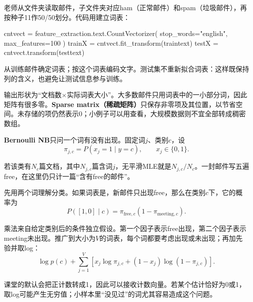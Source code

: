 老师从文件夹读取邮件，子文件夹对应ham（正常邮件）和spam（垃圾邮件），再按种子11作50/50划分。代码用建立词表：



\begin{StudyCode}
cntvect = feature_extraction.text.CountVectorizer(
    stop_words="english", max_features=100
)
trainX = cntvect.fit_transform(traintext)
testX = cntvect.transform(testtext)
\end{StudyCode}


从训练邮件确定词表；按这个词表编码文字。测试集不重新拟合词表：这样既保持列的含义，也避免让测试信息参与训练。


输出形状为“文档数\ensuremath{\times}实际词表大小”。大多数邮件只用词表中的一小部分词，因此矩阵有很多零。\textbf{Sparse matrix（稀疏矩阵）}只保存非零项及其位置，以节省空间。未存储的项仍然表示0；小例子可以用查看，大规模数据则不宜全部转成稠密数组。








\textbf{Bernoulli NB}只问一个词有没有出现。固定词\(j\)、类别\(c\)，设
\[
\pi_{j,c}=P(x_j=1\mid y=c),\qquad x_j\in\{0,1\}.
\tag{2.23}
\]


若该类有\(N_c\)篇文档，其中\(N_{j,c}\)篇含词\(j\)，无平滑MLE就是\(N_{j,c}/N_c\)。一封邮件写五遍free，在这里仍只计一篇“含有free的邮件”。


先用两个词理解分类。如果词表是，新邮件只出现free，那么在类别\(c\)下，它的概率为
\[
P([1,0]\mid c)=\pi_{\mathrm{free},c}(1-\pi_{\mathrm{meeting},c}).
\tag{2.24}
\]


乘法来自给定类别后的条件独立假设。第一个因子表示free出现，第二个因子表示meeting未出现。推广到大小为\(V\)的词表，每个词都要考虑出现或未出现；再加先验并取log：
\[
\log p(c)+\sum_{j=1}^{V}
\left[x_j\log\pi_{j,c}+(1-x_j)\log(1-\pi_{j,c})\right].
\tag{2.25}
\]


课堂的默认会把正计数转成1，因此可以接收计数向量。若某个估计恰好为0或1，取log可能产生无穷值；小样本里“没见过”的词尤其容易造成这个问题。







